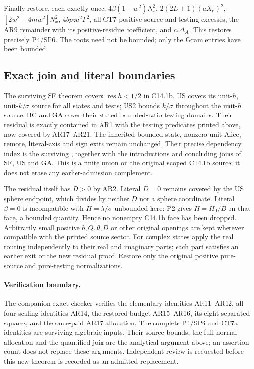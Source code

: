 Finally restore, each exactly once, $4\beta(1+w^2)N_x^2$,
$2(2D+1)(uX_e)^2$, $[2w^2+4mw^2]N_x^2$,
$4bpzu^2\Gamma^2$, all CT7 positive source and testing
excesses, the AR9 remainder with its positive-residue coefficient,
and $c_*\Delta_A$. This restores precisely P4/SP6. The roots
need not be bounded; only the Gram entries have been bounded.

\subsection{Exact join and literal boundaries}

The surviving SF theorem covers $\operatorname{res}h<1/2$ in
C14.1b. US covers its unit-$h$, unit-$k/\sigma$ source for
all states and tests; US2 bounds $k/\sigma$ throughout the
unit-$h$ source. BC and GA cover their stated bounded-ratio
testing domains. Their residual is exactly contained in AR1
with the testing predicates printed above, now covered by
AR17--AR21. The inherited bounded-state, nonzero-unit-Alice,
remote, literal-axis and sign exits remain unchanged. Their
precise dependency index is the surviving
, together with
the introductions and concluding joins of SF, US and GA.
This is a finite union on the original scoped C14.1b source;
it does not erase any earlier-admission complement.

The residual itself has $D>0$ by AR2. Literal $D=0$ remains
covered by the US sphere endpoint, which divides by neither
$D$ nor a sphere coordinate. Literal $\beta=0$ is incompatible
with $H=h/\sigma$ unbounded here: P2 gives $H=H_0/B$ on
that face, a bounded quantity. Hence no nonempty C14.1b face
has been dropped. Arbitrarily small positive $b,Q,\theta,D$
or other original openings are kept wherever compatible with
the printed source sector. For complex states apply the real
routing independently to their real and imaginary parts;
each part satisfies an earlier exit or the new residual proof.
Restore only the original positive pure-source and pure-testing
normalizations.

\paragraph{Verification boundary.}
The companion exact checker verifies the elementary identities
AR11--AR12, all four scaling identities AR14, the restored
budget AR15--AR16, its eight separated squares, and the
once-paid AR17 allocation. The complete P4/SP6 and CT7a
identities are surviving algebraic inputs. Their source bounds,
the full-normal allocation and the quantified join are the
analytical argument above; an assertion count does not replace
these arguments. Independent review is requested before this
new theorem is recorded as an admitted replacement.
